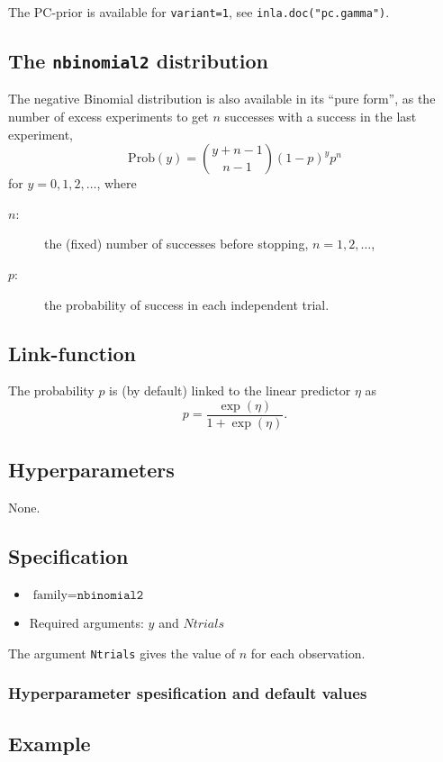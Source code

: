 \documentclass[a4paper,11pt]{article}
\begin{document}
The PC-prior is available for \verb|variant=1|, see
\verb|inla.doc("pc.gamma")|.

\clearpage


\subsection*{The \texttt{nbinomial2} distribution}

The negative Binomial distribution is also available in its ``pure
form'', as the number of excess experiments to get $n$ successes with
a success in the last experiment,
\begin{displaymath}
    \text{Prob}(y) = {y + n -1 \choose n-1} (1-p)^{y} p^{n}
\end{displaymath}
for $y=0, 1, 2, \ldots$, where
\begin{description}
\item[$n$:] the (fixed) number of successes before stopping,
    $n=1, 2, \ldots$,
\item[$p$:] the probability of success in each independent trial.
\end{description}

\subsection*{Link-function}

The probability $p$ is (by default) linked to the linear predictor
$\eta$ as
\begin{displaymath}
    p = \frac{\exp(\eta)}{1+\exp(\eta)}.
\end{displaymath}

\subsection*{Hyperparameters}
None.

\subsection*{Specification}

\begin{itemize}
\item $\text{family}=\texttt{nbinomial2}$
\item Required arguments: $y$ and $Ntrials$
\end{itemize}
The argument \texttt{Ntrials} gives the value of $n$ for each
observation.

\subsubsection*{Hyperparameter spesification and default values}


\subsection*{Example}

\end{document}
